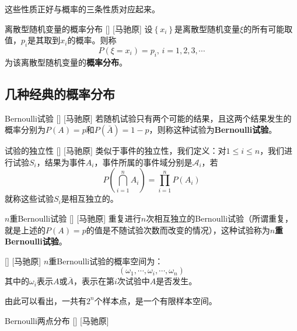 \documentclass[UTF8]{ctexart}
\begin{document}
        这些性质正好与概率的三条性质对应起来。

        \begin{dfn}
            []
            {离散型随机变量的概率分布}
            []
            [马驰原]
            设$\left\{x_i\right\} $是离散型随机变量$\xi$的所有可能取值，$p_i$是其取到$x_i$的概率。则称
            \[P(\xi=x_i)=p_i,\,i=1,2,3,\cdots\]为该离散型随机变量的\textbf{概率分布}。
        \end{dfn}

    \subsection{几种经典的概率分布}
        \begin{dfn}
            []
            {Bernoulli试验}
            []
            [马驰原]
            若随机试验只有两个可能的结果，且这两个结果发生的概率分别为$P(A)=p$和$P(\bar{A})=1-p$，则称这种试验为\textbf{Bernoulli试验}。
        \end{dfn}

        \begin{dfn}
            []
            {试验的独立性}
            []
            [马驰原]
            类似于事件的独立性，我们定义：对$1\leq i\leq n$，我们进行试验$S_i$，结果为事件$A_i$，事件所属的事件域分别是$\mathcal{A}_i$，若\[P\left(\bigcap^{n}_{i=1} A_i\right) =\prod_{i=1}^{n}P(A_i)\]
            就称这些试验$S_i$是相互独立的。
        \end{dfn}

        \begin{dfn}
            []
            {$n$重Bernoulli试验}
            []
            [马驰原]
            重复进行$n$次相互独立的Bernoulli试验（所谓重复，就是上述的$P(A)=p$的值是不随试验次数而改变的情况），这种试验称为\textbf{$n$重Bernoulli试验}。
        \end{dfn}

        \begin{ppt}
            []
            {}
            []
            [马驰原]
            $n$重Bernoulli试验的概率空间为：\[(\omega_1,\cdots,\omega_i,\cdots,\omega_n)\]其中的$\omega_i$表示$A$或$\bar{A}$，表示在第$i$次试验中$A$是否发生。

            由此可以看出，一共有$2^n$个样本点，是一个有限样本空间。
        \end{ppt}

        \begin{dfn}
            []
            {Bernoulli两点分布}
            []
            [马驰原]
        \end{dfn}
\end{document}
